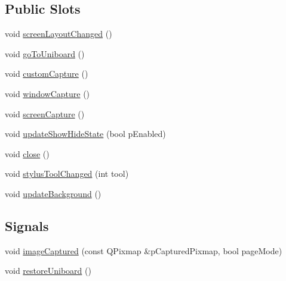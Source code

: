 \subsection*{Public Slots}
\begin{DoxyCompactItemize}
\item 
void \hyperlink{class_u_b_desktop_annotation_controller_a49facf34e657a73cc7c6123a24248e1e}{screen\-Layout\-Changed} ()
\item 
void \hyperlink{class_u_b_desktop_annotation_controller_a19d0e036a5a690a92731e5f1f47a81a2}{go\-To\-Uniboard} ()
\item 
void \hyperlink{class_u_b_desktop_annotation_controller_ae51d5a0076cc7e04d4db8d5881b64c4a}{custom\-Capture} ()
\item 
void \hyperlink{class_u_b_desktop_annotation_controller_a36e716d542c4fcf7672d61c44b846998}{window\-Capture} ()
\item 
void \hyperlink{class_u_b_desktop_annotation_controller_a674888720a2e749717d072657b7f8833}{screen\-Capture} ()
\item 
void \hyperlink{class_u_b_desktop_annotation_controller_a7192127eaf5ed703bd7746deeda63d25}{update\-Show\-Hide\-State} (bool p\-Enabled)
\item 
void \hyperlink{class_u_b_desktop_annotation_controller_a8078da5d7de8e9d2b625c97447ca815f}{close} ()
\item 
void \hyperlink{class_u_b_desktop_annotation_controller_a74acc192dbd8ee18515775c02e0ead44}{stylus\-Tool\-Changed} (int tool)
\item 
void \hyperlink{class_u_b_desktop_annotation_controller_a79025184efcd68c01efced1ff52228e7}{update\-Background} ()
\end{DoxyCompactItemize}
\subsection*{Signals}
\begin{DoxyCompactItemize}
\item 
void \hyperlink{class_u_b_desktop_annotation_controller_ad414f29c170909d189830f837609fbd8}{image\-Captured} (const Q\-Pixmap \&p\-Captured\-Pixmap, bool page\-Mode)
\item 
void \hyperlink{class_u_b_desktop_annotation_controller_a83be6f65f308527b3c5cf5a3cf92ae89}{restore\-Uniboard} ()
\end{DoxyCompactItemize}
